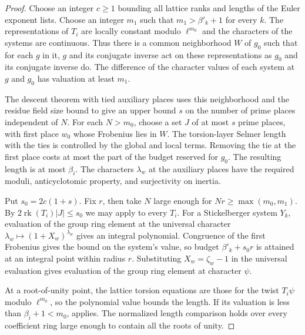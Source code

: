 \begin{proof}
Choose an integer $c\ge1$ bounding all lattice ranks and lengths of the Euler exponent lists. Choose an integer $m_1$ such that $m_1>\beta'_k+1$ for every $k$.
The representations of $T_i$ are locally constant modulo $\ell^{m_0}$ and the characters of the systems are continuous. Thus there is a common neighborhood $W$ of $g_0$ such that for each $g$ in it, $g$ and its conjugate inverse act on these representations as $g_0$ and its conjugate inverse do. The difference of the character values of each system at $g$ and $g_0$ has valuation at least $m_1$.

The descent theorem with tied auxiliary places uses this neighborhood and the residue field size bound to give an upper bound $s$ on the number of prime places independent of $N$.
For each $N>m_0$, choose a set $J$ of at most $s$ prime places, with first place $w_0$ whose Frobenius lies in $W$. The torsion-layer Selmer length with the ties is controlled by the global and local terms.
Removing the tie at the first place costs at most the part of the budget reserved for $g_0$. The resulting length is at most $\beta_i$.
The characters $\lambda_w$ at the auxiliary places have the required moduli, anticyclotomic property, and surjectivity on inertia.

Put $s_0=2c(1+s)$. Fix $r$, then take $N$ large enough for $Nr\ge\max(m_0,m_1)$.
By $2\operatorname{rk}(T_i)|J|\le s_0$ we may apply  to every $T_i$.
For a Stickelberger system $Y_k$, evaluation of the group ring element at the universal character $\lambda_w\mapsto (1+X_w)^{\lambda_w}$ gives an integral polynomial. Congruence of the first Frobenius gives the bound on the system's value, so budget $\beta'_k+s_0r$ is attained at an integral point within radius $r$.
Substituting $X_w=\zeta_w-1$ in the universal evaluation gives evaluation of the group ring element at character $\psi$.

At a root-of-unity point, the lattice torsion equations are those for the twist $T_i\psi$ modulo $\ell^{m_0}$, so the polynomial value bounds the length.
If its valuation is less than $\beta_i+1<m_0$,  applies.
The normalized length comparison holds over every coefficient ring large enough to contain all the roots of unity.
\end{proof}

